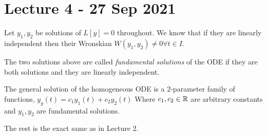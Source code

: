 \section{Lecture 4 - 27 Sep 2021}
Let $y_1,y_2$ be solutions of $L[y]=0$ throughout. We know that if they are linearly
independent then their Wronskian $W(y_1,y_2)\neq 0\forall t\in I$.
\begin{definition}
  The two solutions above are called \emph{fundamental solutions} of the ODE if they are
  both solutions and they are linearly independent.
  \label{fundamentalSolutions}
\end{definition}

\begin{definition}
  The general solution of the homogeneous ODE is a 2-parameter family of functions, 
  $y_{g} (t) = c_1 y_1(t) + c_2 y_2(t)$
  Where $c_1,c_2\in\mathbb R$ are arbitrary constants and $y_1,y_2$ are fundamental solutions.
  \label{familyOfSolutions}
\end{definition}

The rest is the exact same as in Lecture 2.
